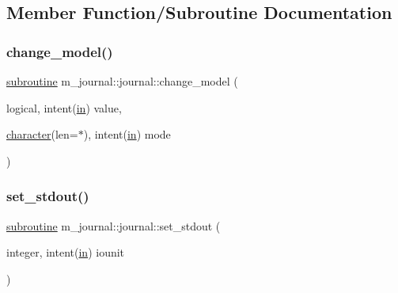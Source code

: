 \subsection{Member Function/\+Subroutine Documentation}
\mbox{\label{interfacem__journal_1_1journal_a653c8f2c31a3cc3bd8b95e3d2e4c290f}} 
\subsubsection{\texorpdfstring{change\+\_\+model()}{change\_model()}}
{\footnotesize\ttfamily \hyperlink{M__stopwatch_83_8txt_acfbcff50169d691ff02d4a123ed70482}{subroutine} m\+\_\+journal\+::journal\+::change\+\_\+model (\begin{DoxyParamCaption}\item[{logical, intent(\hyperlink{M__journal_83_8txt_afce72651d1eed785a2132bee863b2f38}{in})}]{value,  }\item[{\hyperlink{option__stopwatch_83_8txt_abd4b21fbbd175834027b5224bfe97e66}{character}(len=$\ast$), intent(\hyperlink{M__journal_83_8txt_afce72651d1eed785a2132bee863b2f38}{in})}]{mode }\end{DoxyParamCaption})\hspace{0.3cm}{\ttfamily [private]}}

\mbox{\label{interfacem__journal_1_1journal_ab65b84f73ebce1cbac5bbcb047693b87}} 
\subsubsection{\texorpdfstring{set\+\_\+stdout()}{set\_stdout()}}
{\footnotesize\ttfamily \hyperlink{M__stopwatch_83_8txt_acfbcff50169d691ff02d4a123ed70482}{subroutine} m\+\_\+journal\+::journal\+::set\+\_\+stdout (\begin{DoxyParamCaption}\item[{integer, intent(\hyperlink{M__journal_83_8txt_afce72651d1eed785a2132bee863b2f38}{in})}]{iounit }\end{DoxyParamCaption})\hspace{0.3cm}{\ttfamily [private]}}

